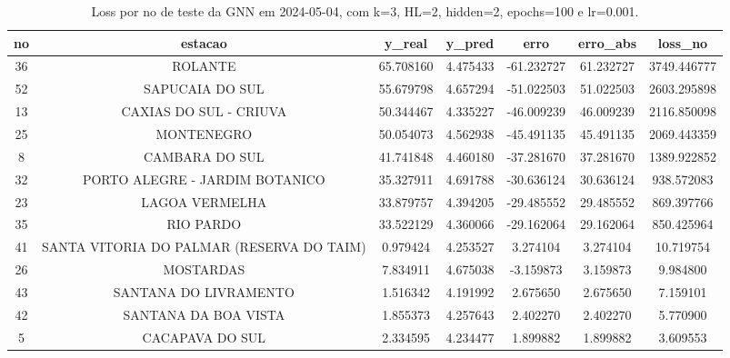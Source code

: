 \begin{table}[h]
\centering
\caption{Loss por no de teste da GNN em 2024-05-04, com k=3, HL=2, hidden=2, epochs=100 e lr=0.001.}
\label{tab:gnn_loss_k3_hl2_h2_e100_d20240504}
\begin{tabular}{ccccccc}
\toprule
no & estacao & y\_real & y\_pred & erro & erro\_abs & loss\_no \\
\midrule
36 & ROLANTE & 65.708160 & 4.475433 & -61.232727 & 61.232727 & 3749.446777 \\
52 & SAPUCAIA DO SUL & 55.679798 & 4.657294 & -51.022503 & 51.022503 & 2603.295898 \\
13 & CAXIAS DO SUL - CRIUVA & 50.344467 & 4.335227 & -46.009239 & 46.009239 & 2116.850098 \\
25 & MONTENEGRO & 50.054073 & 4.562938 & -45.491135 & 45.491135 & 2069.443359 \\
8 & CAMBARA DO SUL & 41.741848 & 4.460180 & -37.281670 & 37.281670 & 1389.922852 \\
32 & PORTO ALEGRE - JARDIM BOTANICO & 35.327911 & 4.691788 & -30.636124 & 30.636124 & 938.572083 \\
23 & LAGOA VERMELHA & 33.879757 & 4.394205 & -29.485552 & 29.485552 & 869.397766 \\
35 & RIO PARDO & 33.522129 & 4.360066 & -29.162064 & 29.162064 & 850.425964 \\
41 & SANTA VITORIA DO PALMAR (RESERVA DO TAIM) & 0.979424 & 4.253527 & 3.274104 & 3.274104 & 10.719754 \\
26 & MOSTARDAS & 7.834911 & 4.675038 & -3.159873 & 3.159873 & 9.984800 \\
43 & SANTANA DO LIVRAMENTO & 1.516342 & 4.191992 & 2.675650 & 2.675650 & 7.159101 \\
42 & SANTANA DA BOA VISTA & 1.855373 & 4.257643 & 2.402270 & 2.402270 & 5.770900 \\
5 & CACAPAVA DO SUL & 2.334595 & 4.234477 & 1.899882 & 1.899882 & 3.609553 \\
\bottomrule
\end{tabular}
\end{table}
